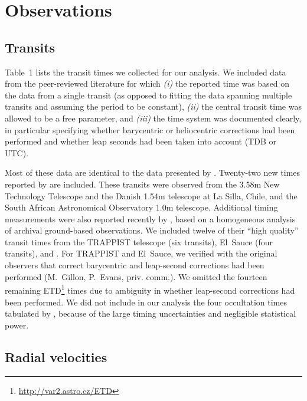 \documentclass[12pt,twocolumn,tighten]{aastex62}
\begin{document}
\section{Observations}
\label{sec:observations}

\subsection{Transits}

Table~1 lists the transit times we collected for our analysis.  We
included data from the peer-reviewed literature for which {\it (i)} the
reported time was based on the data from a single transit (as opposed
to fitting the data spanning multiple transits and assuming the
period to be constant), {\it (ii)} the
central transit time was allowed to be a free parameter, and {\it (iii)} the time
system was documented clearly, in particular specifying
whether barycentric or heliocentric corrections had been
performed and whether leap seconds had been taken into account (TDB or UTC).

Most of these data are identical to the data presented by
.  Twenty-two new times reported by
\citet{southworth_transit_2019} are included.  These transits were
observed from the 3.58m New Technology Telescope and the Danish 1.54m telescope at La Silla, Chile,
and the South African Astronomical Observatory 1.0m telescope.
Additional timing measurements were also reported recently by
\citet{baluev_2019}, based on a homogeneous analysis of archival
ground-based observations.
We included twelve of their ``high quality'' transit times from
the TRAPPIST telescope (six transits), El~Sauce (four transits), and
\citet{petrucci_no_2013}.  For TRAPPIST and El~Sauce, we verified with
the original observers that correct barycentric and leap-second
corrections had been performed (M.~Gillon, P.~Evans, priv{.} comm{.}).
We omitted the fourteen remaining \citeauthor{baluev_2019}
ETD\footnote{\url{http://var2.astro.cz/ETD}} times due to ambiguity in
whether leap-second corrections had been performed.
We did not include in our analysis the four occultation times tabulated by
, because of the large timing
uncertainties and negligible statistical power.

\subsection{Radial velocities}
\end{document}
